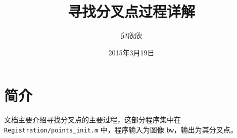 \documentclass[12pt]{article}
\begin{document}
\title{\vspace{-2em}寻找分叉点过程详解\vspace{-0.7em}}
\author{邱欣欣}
\date{\vspace{-0.7em}2015年3月19日\vspace{-0.7em}}
\maketitle\thispagestyle{fancy}

\section{简介}
文档主要介绍寻找分叉点的主要过程，这部分程序集中在 \verb|Registration/points_init.m| 中，程序输入为图像 \verb|bw|，输出为其分叉点。
\end{document}
